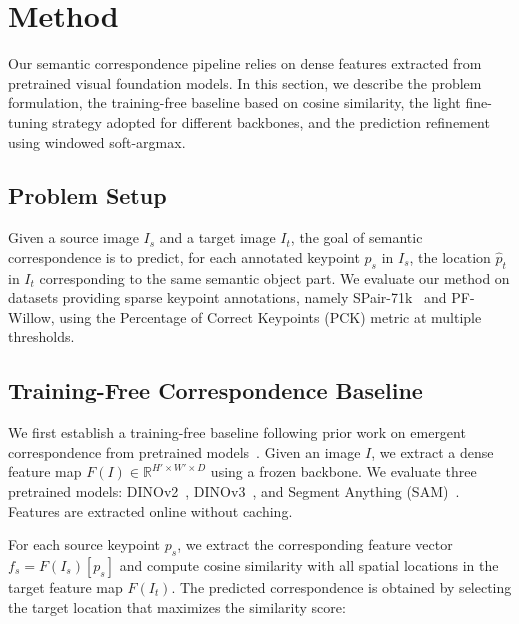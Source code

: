 \section{Method}
\label{sec:method}

Our semantic correspondence pipeline relies on dense features extracted from pretrained visual foundation models. In this section, we describe
the problem formulation, the training-free baseline based on cosine similarity, the light fine-tuning strategy adopted for different backbones,
and the prediction refinement using windowed soft-argmax.


\subsection{Problem Setup}

Given a source image $I_s$ and a target image $I_t$, the goal of semantic correspondence is to predict, for each annotated keypoint $p_s$ in $I_s$,
the location $\hat{p}_t$ in $I_t$ corresponding to the same semantic object part. We evaluate our method on datasets providing sparse keypoint
annotations, namely SPair-71k~\cite{min2019spair} and PF-Willow, using the Percentage of Correct Keypoints (PCK) metric at multiple thresholds.


\subsection{Training-Free Correspondence Baseline}

We first establish a training-free baseline following prior work on emergent correspondence from pretrained models~\cite{tang2023emergent, zhang2023tale}.
Given an image $I$, we extract a dense feature map $F(I) \in \mathbb{R}^{H' \times W' \times D}$ using a frozen backbone. We evaluate three pretrained
models: DINOv2~\cite{oquab2023dinov2}, DINOv3~\cite{simeoni2025dinov3}, and Segment Anything (SAM)~\cite{kirillov2023segment}. Features are extracted online without caching.

For each source keypoint $p_s$, we extract the corresponding feature vector $f_s = F(I_s)[p_s]$ and compute cosine similarity with all spatial locations
in the target feature map $F(I_t)$. The predicted correspondence is obtained by selecting the target location that maximizes the similarity score:

